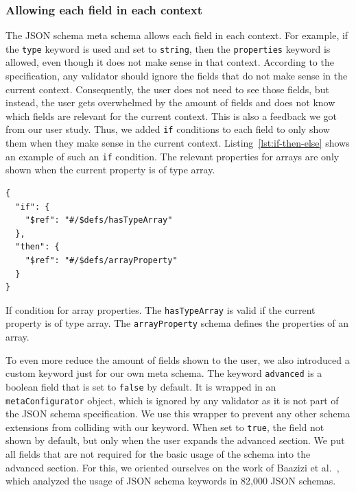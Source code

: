 \subsubsection{Allowing each field in each context}
The JSON schema meta schema allows each field in each context.
For example, if the \texttt{type} keyword is used and set to \texttt{string}, then the \texttt{properties} keyword is allowed,
even though it does not make sense in that context.
According to the specification, any validator should ignore the fields that do not make sense in the current context.
Consequently, the user does not need to see those fields, but instead, the user gets overwhelmed by the amount of fields
and does not know which fields are relevant for the current context.
This is also a feedback we got from our user study.
Thus, we added \texttt{if} conditions to each field to only show them when they make sense in the current context.
Listing~\ref{lst:if-then-else} shows an example of such an \texttt{if} condition.
The relevant properties for arrays are only shown when the current property is of type array.

\begin{listing}[!h]
    \begin{verbatim}
{
  "if": {
    "$ref": "#/$defs/hasTypeArray"
  },
  "then": {
    "$ref": "#/$defs/arrayProperty"
  }
}
    \end{verbatim}
    \caption{If condition for array properties. The \texttt{hasTypeArray} is valid if the current property is of type array. The \texttt{arrayProperty} schema defines the properties of an array.}
    \label{lst:if-then-else}
\end{listing}

To even more reduce the amount of fields shown to the user, we also introduced a custom keyword just for our own meta schema.
The keyword \texttt{advanced} is a boolean field that is set to \texttt{false} by default.
It is wrapped in an \texttt{metaConfigurator} object, which is ignored by any validator as it is not part of the JSON schema specification.
We use this wrapper to prevent any other schema extensions from colliding with our keyword.
When set to \texttt{true}, the field not shown by default, but only when the user expands the advanced section.
We put all fields that are not required for the basic usage of the schema into the advanced section.
For this, we oriented ourselves on the work of Baazizi et al.~\cite{baazizi2021empirical}, which analyzed the usage of JSON schema keywords in 82,000 JSON schemas.


